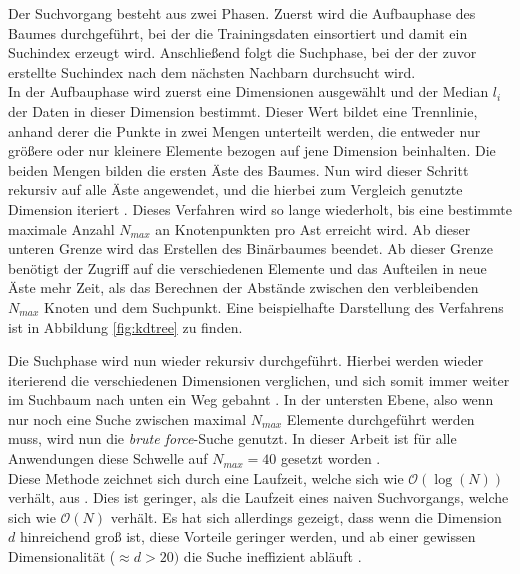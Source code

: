 
Der Suchvorgang besteht aus zwei Phasen. Zuerst wird die Aufbauphase des Baumes durchgeführt, bei der die Trainingsdaten einsortiert und damit ein Suchindex erzeugt wird. Anschließend folgt die Suchphase, bei der der zuvor erstellte Suchindex nach dem nächsten Nachbarn durchsucht wird.\\

In der Aufbauphase wird zuerst eine Dimensionen ausgewählt und der Median $l_i$ der Daten in dieser Dimension bestimmt. Dieser Wert bildet eine Trennlinie, anhand derer die Punkte in zwei Mengen unterteilt werden, die entweder nur größere oder nur kleinere Elemente bezogen auf jene Dimension beinhalten. Die beiden Mengen bilden die ersten Äste des Baumes. Nun wird dieser Schritt rekursiv auf alle Äste angewendet, und die hierbei zum Vergleich genutzte Dimension iteriert \cite{de2000computational}. Dieses Verfahren wird so lange wiederholt, bis eine bestimmte maximale Anzahl $N_{max}$ an Knotenpunkten pro Ast erreicht wird. Ab dieser unteren Grenze wird das Erstellen des Binärbaumes beendet. Ab dieser Grenze benötigt der Zugriff auf die verschiedenen Elemente und das Aufteilen in neue Äste mehr Zeit, als das Berechnen der Abstände zwischen den verbleibenden $N_{max}$ Knoten und dem Suchpunkt. Eine beispielhafte Darstellung des Verfahrens ist in Abbildung \ref{fig:kdtree} zu finden.

Die Suchphase wird nun wieder rekursiv durchgeführt. Hierbei werden wieder iterierend die verschiedenen Dimensionen verglichen, und sich somit immer weiter im Suchbaum nach unten ein Weg gebahnt \cite{de2000computational}. In der untersten Ebene, also wenn nur noch eine Suche zwischen maximal $N_{max}$ Elemente durchgeführt werden muss, wird nun die \textit{brute force}-Suche genutzt. In dieser Arbeit ist für alle Anwendungen diese Schwelle auf $N_{max} = 40$ gesetzt worden \citep{scikitlearnneighbours}.\\

Diese Methode zeichnet sich durch eine Laufzeit, welche sich wie $\mathcal{O}(\log(N))$ verhält, aus \cite{bentley1975multidimensional}. Dies ist geringer, als die Laufzeit eines naiven Suchvorgangs, welche sich wie $\mathcal{O}(N)$ verhält. Es hat sich allerdings gezeigt, dass wenn die Dimension $d$ hinreichend groß ist, diese Vorteile geringer werden, und ab einer gewissen Dimensionalität ($\approx d > 20)$ die Suche ineffizient abläuft \citep{scikitlearnneighbours}.\\


